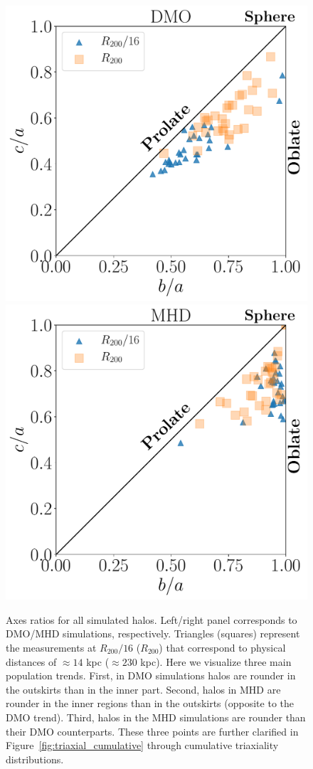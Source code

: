 \documentclass[usenatbib]{mnras}
\begin{document}
 
\begin{figure}
\begin{center}
\includegraphics[width=0.8\columnwidth]{Lvl_4_Triax_Plane_DM.pdf}
\includegraphics[width=0.8\columnwidth]{Lvl_4_Triax_Plane_MHD.pdf}
\end{center}
\caption{Axes ratios for all simulated halos.
  Left/right panel corresponds to DMO/MHD simulations, respectively.
  Triangles (squares) represent the measurements at $R_{200}/16$
  ($R_{200}$) that correspond to physical distances of $\approx14$ kpc
  ($\approx 230$ kpc).
  Here we visualize three main population trends.
  First, in DMO simulations halos are rounder in the outskirts
  than in the inner part.
  Second, halos in MHD are rounder in the inner regions than in
  the outskirts (opposite to the DMO trend). 
  Third, halos in the MHD simulations are rounder than their DMO counterparts.
  These three points are further clarified in
  Figure~\ref{fig:triaxial_cumulative} through cumulative triaxiality distributions.}
  \label{fig:triaxiality_plane}
\end{figure}
\end{document}
